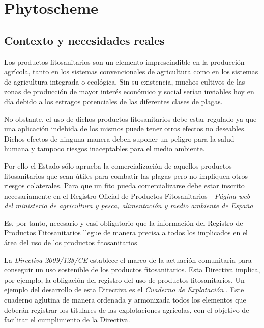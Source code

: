 \chapter{Phytoscheme} \label{phytoscheme}
\section{Contexto y necesidades reales} \label{phytoscheme.contexto}
Los productos fitosanitarios son un elemento imprescindible en la producción agrícola, tanto en los sistemas convencionales de agricultura como en los sistemas de agricultura integrada o ecológica. Sin su existencia, muchos cultivos de las zonas de producción de mayor interés económico y social serían inviables hoy en día debido a los estragos potenciales de las diferentes clases de plagas.\par
No obstante, el uso de dichos productos fitosanitarios debe estar regulado ya que una aplicación indebida de los mismos puede tener otros efectos no deseables. Dichos efectos de ninguna manera deben suponer un peligro para la salud humana y tampoco riesgos inaceptables para el medio ambiente. \par
Por ello el Estado sólo aprueba la comercialización de aquellos productos fitosanitarios que sean útiles para combatir las plagas pero no impliquen otros riesgos colaterales. Para que un \gls{fito} pueda comercializarse debe estar inscrito necesariamente en el Registro Oficial de Productos Fitosanitarios - \textit{Página web del ministerio de agricultura y pesca, alimentación y medio ambiente de España} \cite{mapama}\par
Es, por tanto, necesario y casi obligatorio que la información del Registro de Productos Fitosanitarios llegue de manera precisa a todos los implicados en el área del uso de los productos fitosanitarios\par
La \textit{Directiva 2009/128/CE} \cite{directiva128} establece el marco de la actuación comunitaria para conseguir un uso sostenible de los productos fitosanitarios. Esta Directiva implica, por ejemplo, la obligación del registro del uso de productos fitosanitarios. Un ejemplo del desarrollo de esta Directiva es el \textit{Cuaderno de Explotación} \cite{cuadernoexplotacion}. Este cuaderno aglutina de manera ordenada y armonizada todos los elementos que deberán registrar los titulares de las explotaciones agrícolas, con el objetivo de facilitar el cumplimiento de la Directiva.\par
